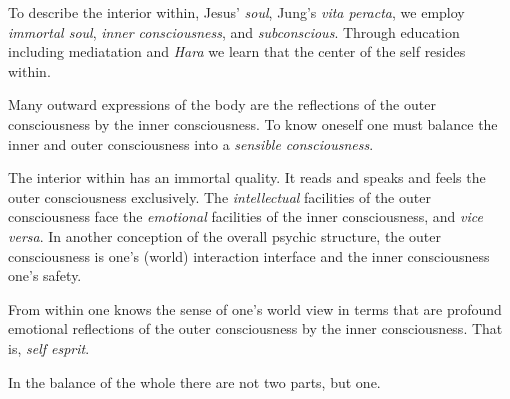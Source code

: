 

To describe the interior within, Jesus' {\it soul}, Jung's {\it vita
peracta}, we employ {\it immortal soul}, {\it inner consciousness},
and {\it subconscious}.  Through education including mediatation and
{\it Hara} we learn that the center of the self resides within.  

Many outward expressions of the body are the reflections of the outer
consciousness by the inner consciousness.  To know oneself one must
balance the inner and outer consciousness into a {\it sensible
consciousness}.

The interior within has an immortal quality.  It reads and speaks and
feels the outer consciousness exclusively.  The {\it intellectual}
facilities of the outer consciousness face the {\it emotional}
facilities of the inner consciousness, and {\it vice versa}.  In
another conception of the overall psychic structure, the outer
consciousness is one's (world) interaction interface and the inner
consciousness one's safety.

From within one knows the sense of one's world view in terms that are
profound emotional reflections of the outer consciousness by the inner
consciousness.  That is, {\it self esprit}.  

In the balance of the whole there are not two parts, but one.

\bye
